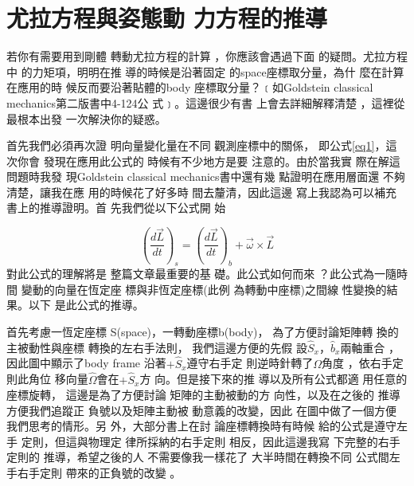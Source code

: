 \documentclass[12pt,twoside]{article}
\begin{document}
\part{尤拉方程與姿態動%
力方程的推導}

若你有需要用到剛體%
轉動尤拉方程的計算%
，你應該會遇過下面%
的疑問。尤拉方程中%
的力矩項，明明在推%
導的時候是沿著固定%
的space座標取分量，為什%
麼在計算在應用的時%
候反而要沿著貼體的body%
座標取分量？﹝如Goldstein
classical mechanics第二版書中4-124公%
式﹞。這邊很少有書%
上會去詳細解釋清楚%
，這裡從最根本出發%
一次解決你的疑惑。

首先我們必須再次證%
明向量變化量在不同%
觀測座標中的關係，%
即公式\ref{eq1}，這次你會%
發現在應用此公式的%
時候有不少地方是要%
注意的。由於當我實%
際在解這問題時我發%
現Goldstein classical mechanics書中還有幾%
點證明在應用層面還%
不夠清楚，讓我在應%
用的時候花了好多時%
間去釐清，因此這邊%
寫上我認為可以補充%
書上的推導證明。首%
先我們從以下公式開%
始

\begin{equation}
\left( \frac{d\vec{L}}{dt}\right) _{s}=\left( \frac{d\vec{L}}{dt}\right)
_{b}+\vec{\omega}\times \vec{L}  \label{eq1}
\end{equation}%
對此公式的理解將是%
整篇文章最重要的基%
礎。此公式如何而來%
？此公式為一隨時間%
變動的向量在恆定座%
標與非恆定座標(此例%
為轉動中座標)之間線%
性變換的結果。以下%
是此公式的推導。

\begin{figure}[th]
\caption{{}}
\label{firstfig}
\begin{center}
\fbox{}
\end{center}
\end{figure}
\bigskip

首先考慮一恆定座標%
S(space)，一轉動座標b(body)，%
為了方便討論矩陣轉%
換的主被動性與座標%
轉換的左右手法則，%
我們這邊方便的先假%
設$\hat{S}_{x}， \hat{b}_{x}$兩軸重合%
，因此圖中顯示了body frame%
沿著$+\hat{S}_{x}$遵守右手定%
則逆時針轉了$\Omega $角度%
，依右手定則此角位%
移向量$\hat{\Omega}$會在$+\hat{S}_{x}$方%
向。但是接下來的推%
導以及所有公式都適%
用任意的座標旋轉，%
這邊是為了方便討論%
矩陣的主動被動的方%
向性，以及在之後的%
推導方便我們追蹤正%
負號以及矩陣主動被%
動意義的改變，因此%
在圖中做了一個方便%
我們思考的情形。另%
外，大部分書上在討%
論座標轉換時有時候%
給的公式是遵守左手%
定則，但這與物理定%
律所採納的右手定則%
相反，因此這邊我寫%
下完整的右手定則的%
推導，希望之後的人%
不需要像我一樣花了%
大半時間在轉換不同%
公式間左手右手定則%
帶來的正負號的改變%
。
\end{document}
